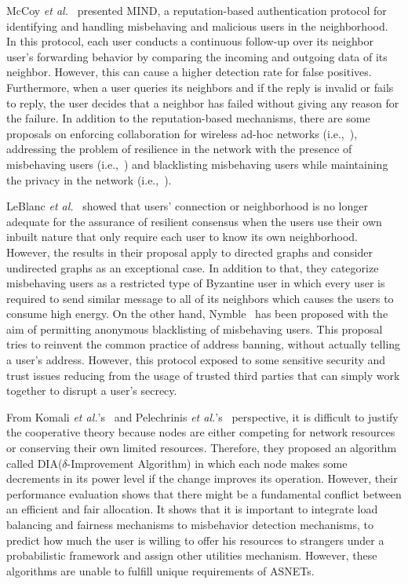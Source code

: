 McCoy {\it et al.}~\cite{DMcCoy2007} presented MIND, a reputation-based authentication protocol for identifying and handling misbehaving and malicious users in the neighborhood. In this protocol, each user conducts a continuous follow-up over its neighbor user's forwarding behavior by comparing the incoming and outgoing data of its neighbor. However, this can cause a higher detection rate for false positives. Furthermore, when a user queries its neighbors and if the reply is invalid or fails to reply, the user decides that a neighbor has failed without giving any reason for the failure. In addition to the reputation-based mechanisms, there are some proposals on enforcing collaboration for wireless ad-hoc networks (i.e.,~\cite{NJiang2007}), addressing the problem of resilience in the network with the presence of misbehaving users (i.e.,~\cite{HJLeBlanc2013}) and blacklisting misbehaving users while maintaining the privacy in the network (i.e.,~\cite{PPTsang2011}).

LeBlanc {\it et al.}~\cite{HJLeBlanc2013} showed that users' connection or neighborhood is no longer adequate for the assurance of resilient consensus when the users use their own inbuilt nature that only require each user to know its own neighborhood. However, the results in their proposal apply to directed graphs and consider undirected graphs as an exceptional case. In addition to that, they categorize misbehaving users as a restricted type of Byzantine user in which every user is required to send similar message to all of its neighbors which causes the users to consume high energy.  On the other hand, Nymble~\cite{PPTsang2011} has been proposed with the aim of permitting anonymous blacklisting of misbehaving users. This proposal tries to reinvent the common practice of address banning, without actually telling a user's address. However, this protocol exposed to some sensitive security and trust issues reducing from the usage of trusted third parties that can simply work together to disrupt a user's secrecy.

From Komali {\it et al.}'s~\cite{RSKomali2008} and Pelechrinis {\it et al.}'s~\cite{KPelechrinis2012} perspective, it is difficult to justify the cooperative theory because nodes are either competing for network resources or conserving their own limited resources. Therefore, they proposed an algorithm called DIA($\delta$-Improvement Algorithm) in which each node makes some decrements in its power level if the change improves its operation. However, their performance evaluation shows that there might be a fundamental conflict between an efficient and fair allocation. It shows that it is important to integrate load balancing and fairness mechanisms to misbehavior detection mechanisms, to predict how much the user is willing to offer his resources to strangers under a probabilistic framework and assign other utilities mechanism. However, these algorithms are unable to fulfill unique requirements of ASNETs.

